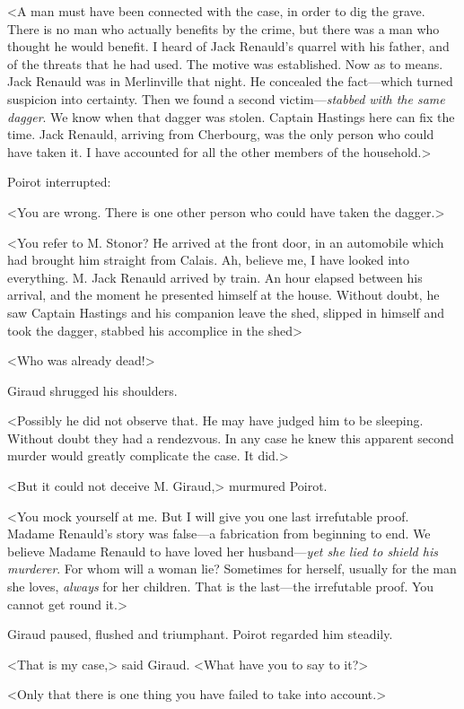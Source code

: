  <A man must have been connected with the case, in order to dig the grave. There is no man who actually benefits by the crime, but there was a man who thought he would benefit. I heard of Jack Renauld's quarrel with his father, and of the threats that he had used. The motive was established. Now as to means. Jack Renauld was in Merlinville that night. He concealed the fact—which turned suspicion into certainty. Then we found a second victim—\emph{stabbed with the same dagger}. We know when that dagger was stolen. Captain Hastings here can fix the time. Jack Renauld, arriving from Cherbourg, was the only person who could have taken it. I have accounted for all the other members of the household.> 

 Poirot interrupted: 

 <You are wrong. There is one other person who could have taken the dagger.> 

 <You refer to M. Stonor? He arrived at the front door, in an automobile which had brought him straight from Calais. Ah, believe me, I have looked into everything. M. Jack Renauld arrived by train. An hour elapsed between his arrival, and the moment he presented himself at the house. Without doubt, he saw Captain Hastings and his companion leave the shed, slipped in himself and took the dagger, stabbed his accomplice in the shed\longdash> 

 <Who was already dead!> 

 Giraud shrugged his shoulders. 

 <Possibly he did not observe that. He may have judged him to be sleeping. Without doubt they had a rendezvous. In any case he knew this apparent second murder would greatly complicate the case. It did.> 

 <But it could not deceive M. Giraud,> murmured Poirot. 

 <You mock yourself at me. But I will give you one last irrefutable proof. Madame Renauld's story was false—a fabrication from beginning to end. We believe Madame Renauld to have loved her husband—\emph{yet she lied to shield his murderer}. For whom will a woman lie? Sometimes for herself, usually for the man she loves, \emph{always} for her children. That is the last—the irrefutable proof. You cannot get round it.> 

 Giraud paused, flushed and triumphant. Poirot regarded him steadily. 

 <That is my case,> said Giraud. <What have you to say to it?> 

 <Only that there is one thing you have failed to take into account.> 

